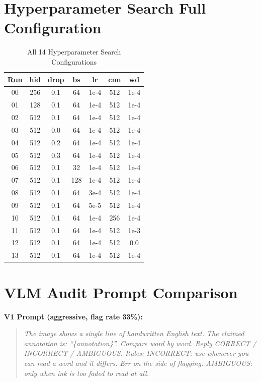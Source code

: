 \documentclass[conference]{IEEEtran}
\begin{document}
\appendix
\section{Hyperparameter Search Full Configuration}

\begin{table}[h]
\centering
\caption{All 14 Hyperparameter Search Configurations}
\label{tab:hparam_full}
\begin{tabular}{@{}ccccccc@{}}
\toprule
\textbf{Run} & \textbf{hid} & \textbf{drop} & \textbf{bs} & \textbf{lr} & \textbf{cnn} & \textbf{wd} \\
\midrule
00 & 256 & 0.1 & 64 & 1e-4 & 512 & 1e-4 \\
01 & 128 & 0.1 & 64 & 1e-4 & 512 & 1e-4 \\
02 & 512 & 0.1 & 64 & 1e-4 & 512 & 1e-4 \\
03 & 512 & 0.0 & 64 & 1e-4 & 512 & 1e-4 \\
04 & 512 & 0.2 & 64 & 1e-4 & 512 & 1e-4 \\
05 & 512 & 0.3 & 64 & 1e-4 & 512 & 1e-4 \\
06 & 512 & 0.1 & 32 & 1e-4 & 512 & 1e-4 \\
07 & 512 & 0.1 & 128 & 1e-4 & 512 & 1e-4 \\
08 & 512 & 0.1 & 64 & 3e-4 & 512 & 1e-4 \\
09 & 512 & 0.1 & 64 & 5e-5 & 512 & 1e-4 \\
10 & 512 & 0.1 & 64 & 1e-4 & 256 & 1e-4 \\
11 & 512 & 0.1 & 64 & 1e-4 & 512 & 1e-3 \\
12 & 512 & 0.1 & 64 & 1e-4 & 512 & 0.0 \\
13 & 512 & 0.1 & 64 & 1e-4 & 512 & 1e-4 \\
\bottomrule
\end{tabular}
\end{table}

\section{VLM Audit Prompt Comparison}

\textbf{V1 Prompt (aggressive, flag rate 33\%):}
\begin{quote}\small
\textit{The image shows a single line of handwritten English text. The claimed annotation is: ``\{annotation\}''. Compare word by word. Reply CORRECT / INCORRECT / AMBIGUOUS. Rules: INCORRECT: use whenever you can read a word and it differs. Err on the side of flagging. AMBIGUOUS: only when ink is too faded to read at all.}
\end{quote}
\end{document}
